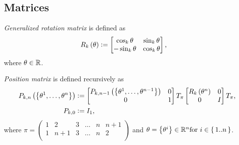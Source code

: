 \documentclass[stu, babel, american, biblatex, a4paper, draftall]{apa7}
\begin{document}
\subsection{Matrices}
\begin{definition}\label{RotationMatrix}
    \textit{Generalized rotation matrix} is defined as
    \begin{align*}
        R_k\left(\theta\right) & \vcentcolon=
        \begin{bmatrix}
            \cos_k{\theta}  & \sin_k{\theta} \\
            -\sin_k{\theta} & \cos_k{\theta} \\
        \end{bmatrix}\text{,}
    \end{align*}
    where $\theta\in\mathbb{R}$.
\end{definition}
\begin{definition}\label{PositionMatrix}
    \textit{Position matrix} is defined recursively as
    \begin{align*}
        P_{k,n}\left(\left\{\tensor{\theta}{^1},\dots,\tensor{\theta}{^n}\right\}\right) & \defeq
        \begin{bmatrix}
            P_{k,n-1}\left(\left\{\tensor{\theta}{^1},\dots,\tensor{\theta}{^{n-1}}\right\}\right) & 0 \\
            0                                                                                      & 1 \\
        \end{bmatrix}
        T_\pi
        \begin{bmatrix}
            R_k\left(\tensor{\theta}{^n}\right) & 0 \\
            0                                   & I \\
        \end{bmatrix}
        T_\pi \text{,}                                                                                        \\
        P_{k,0}                                                                          & \defeq I_1\text{,}
    \end{align*}
    where $\pi=\begin{pmatrix}
            1 & 2   & 3 & \dots & n & n+1 \\
            1 & n+1 & 3 & \dots & n & 2   \\
        \end{pmatrix}$
    and $\theta=\left\{\tensor{\theta}{^i}\right\}\in\real^n  \text{for } i\in\range{1}{n}$.
\end{definition}
\end{document}
